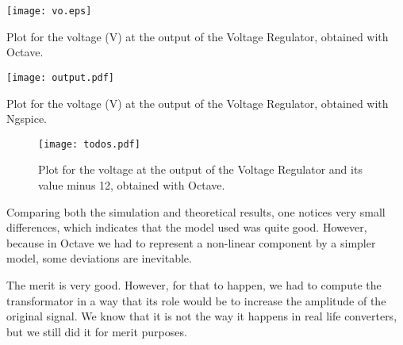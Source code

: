 \begin{minipage}[b]{0.48\textwidth}
\centering
\texttt{[image: vo.eps]}
\captionsetup{type=figure}
\caption{Plot for the voltage (V) at the output of the Voltage Regulator, obtained with Octave.}
\label{vo_octave}
\end{minipage}
\begin{minipage}[b]{0.48\textwidth}
\centering
\texttt{[image: output.pdf]}
\captionsetup{type=figure}
\caption{Plot for the voltage (V) at the output of the Voltage Regulator, obtained with Ngspice.}
\label{vo_ngspice}
\end{minipage} 




\begin{figure}[h] \centering
\texttt{[image: todos.pdf]}
\caption{Plot for the voltage at the output of the Voltage Regulator and its value minus 12, obtained with Octave.}
\label{todos!!}
\end{figure}


\renewcommand{\arraystretch}{1.5}
%     
\vspace{3mm}
\par Comparing both the simulation and theoretical results, one notices very small differences, which indicates that the model used was quite good. However, because in Octave we had to represent a non-linear component by a simpler model, some deviations are inevitable.
\vspace{3mm}
\par The merit is very good. However, for that to happen, we had to compute the transformator in a way that its role would be to increase the amplitude of the original signal. We know that it is not the way it happens in real life converters, but we still did it for merit purposes.
\vspace{5mm}






